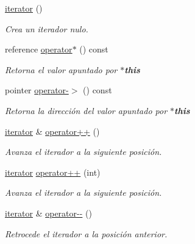 \begin{DoxyCompactItemize}
\item 
\hyperlink{classaed2_1_1map_1_1iterator_acdd790eb54216601a2e0591776004dba_acdd790eb54216601a2e0591776004dba}{iterator} ()
\begin{DoxyCompactList}\small\item\em \-Crea un iterador nulo. \end{DoxyCompactList}\item 
reference \hyperlink{classaed2_1_1map_1_1iterator_a48e75896997d516fe69bc18f889222fe_a48e75896997d516fe69bc18f889222fe}{operator$\ast$} () const 
\begin{DoxyCompactList}\small\item\em \-Retorna el valor apuntado por {\bfseries $\ast$this} \end{DoxyCompactList}\item 
pointer \hyperlink{classaed2_1_1map_1_1iterator_a227de3b56a6ff2e6bb6de2d08277ca60_a227de3b56a6ff2e6bb6de2d08277ca60}{operator-\/$>$} () const 
\begin{DoxyCompactList}\small\item\em \-Retorna la dirección del valor apuntado por {\bfseries $\ast$this} \end{DoxyCompactList}\item 
\hyperlink{classaed2_1_1map_1_1iterator}{iterator} \& \hyperlink{classaed2_1_1map_1_1iterator_a7c44de7f0508186e135ddbcfe782fec5_a7c44de7f0508186e135ddbcfe782fec5}{operator++} ()
\begin{DoxyCompactList}\small\item\em \-Avanza el iterador a la siguiente posición. \end{DoxyCompactList}\item 
\hyperlink{classaed2_1_1map_1_1iterator}{iterator} \hyperlink{classaed2_1_1map_1_1iterator_af4fe5565eb478cfccd254b2ef230b974_af4fe5565eb478cfccd254b2ef230b974}{operator++} (int)
\begin{DoxyCompactList}\small\item\em \-Avanza el iterador a la siguiente posición. \end{DoxyCompactList}\item 
\hyperlink{classaed2_1_1map_1_1iterator}{iterator} \& \hyperlink{classaed2_1_1map_1_1iterator_ae7f70f71545d2a9de17b65edaaec748a_ae7f70f71545d2a9de17b65edaaec748a}{operator-\/-\/} ()
\begin{DoxyCompactList}\small\item\em \-Retrocede el iterador a la posición anterior. \end{DoxyCompactList}\item 

\end{DoxyCompactItemize}

